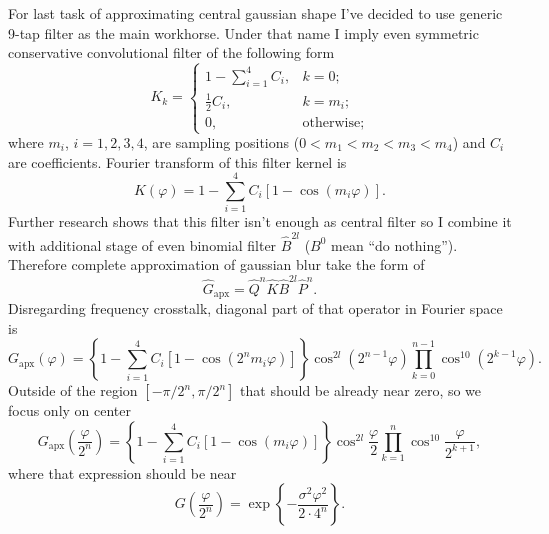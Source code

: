 \documentclass[10pt]{article}
\begin{document}
For last task of approximating central gaussian shape I've decided to use generic 9-tap filter as
the main workhorse. Under that name I imply even symmetric conservative convolutional filter of the
following form
\begin{equation}
    K_k = \left\{
        \begin{array}{ll}
            1 - \sum_{i=1}^4 C_i,& k = 0;\\
            \frac12 C_i,& k = m_i;\\
            0,& \text{otherwise};
        \end{array}
    \right.
\end{equation}
where $m_i$, $i=1, 2, 3, 4$, are sampling positions ($0 < m_1 < m_2 < m_3 < m_4$) and $C_i$ are
coefficients. Fourier transform of this filter kernel is
\begin{equation}
    K(\varphi) = 1 - \sum_{i=1}^4 C_i[1 - \cos(m_i\varphi)].
\end{equation}
Further research shows that this filter isn't enough as central filter so I combine it with
additional stage of even binomial filter $\hat B^{2l}$ ($B^0$ mean ``do nothing''). Therefore
complete approximation of gaussian blur take the form of
\begin{equation}
    \hat G_{\text{apx}} = \hat Q^n\hat K\hat B^{2l}\hat P^n.
\end{equation}
Disregarding frequency crosstalk, diagonal part of that operator in Fourier space is
\begin{equation}
    G_{\text{apx}}(\varphi) = \left\{1 - \sum_{i=1}^4 C_i[1 - \cos(2^nm_i\varphi)]\right\}
        \cos^{2l}(2^{n-1}\varphi) \prod_{k=0}^{n-1} \cos^{10}(2^{k-1}\varphi).
\end{equation}
Outside of the region $[-\pi/2^n, \pi/2^n]$ that should be already near zero, so we focus only on
center
\begin{equation}
    G_{\text{apx}}\left(\frac\varphi{2^n}\right) =
        \left\{1 - \sum_{i=1}^4 C_i[1 - \cos(m_i\varphi)]\right\}
        \cos^{2l}\frac\varphi2 \prod_{k=1}^n \cos^{10}\frac\varphi{2^{k+1}},
\end{equation}
where that expression should be near
\begin{equation}
    G\left(\frac\varphi{2^n}\right) = \exp\left\{-\frac{\sigma^2\varphi^2}{2\cdot4^n}\right\}.
\end{equation}
\end{document}
